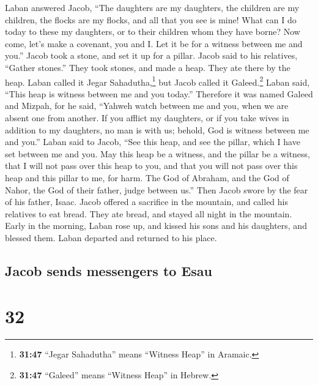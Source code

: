  Laban answered Jacob, ``The daughters are my daughters,
the children are my children, the flocks are my flocks, and all that you
see is mine! What can I do today to these my daughters, or to their
children whom they have borne?  Now come, let's make a
covenant, you and I. Let it be for a witness between me and you.''
 Jacob took a stone, and set it up for a pillar.
 Jacob said to his relatives, ``Gather stones.'' They
took stones, and made a heap. They ate there by the heap.
 Laban called it Jegar Sahadutha,\footnote{\textbf{31:47}
  ``Jegar Sahadutha'' means ``Witness Heap'' in Aramaic.} but Jacob
called it Galeed.\footnote{\textbf{31:47} ``Galeed'' means ``Witness
  Heap'' in Hebrew.}  Laban said, ``This heap is witness
between me and you today.'' Therefore it was named Galeed
 and Mizpah, for he said, ``Yahweh watch between me and
you, when we are absent one from another.  If you afflict
my daughters, or if you take wives in addition to my daughters, no man
is with us; behold, God is witness between me and you.'' 
Laban said to Jacob, ``See this heap, and see the pillar, which I have
set between me and you.  May this heap be a witness, and
the pillar be a witness, that I will not pass over this heap to you, and
that you will not pass over this heap and this pillar to me, for harm.
 The God of Abraham, and the God of Nahor, the God of
their father, judge between us.'' Then Jacob swore by the fear of his
father, Isaac.  Jacob offered a sacrifice in the
mountain, and called his relatives to eat bread. They ate bread, and
stayed all night in the mountain.  Early in the morning,
Laban rose up, and kissed his sons and his daughters, and blessed them.
Laban departed and returned to his place.

\hypertarget{jacob-sends-messengers-to-esau}{%
\subsection{Jacob sends messengers to
Esau}\label{jacob-sends-messengers-to-esau}}

\hypertarget{section-31}{%
\section{32}\label{section-31}}

